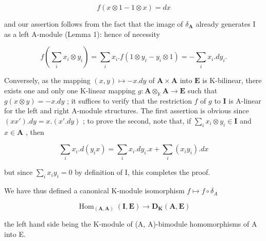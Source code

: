 \[
f (x \otimes 1 - 1 \otimes x) = d x
\]

and our assertion follows from the fact that the image of \(\delta_{\mathbf{A}}\) already generates I as a left A-module (Lemma 1): hence of necessity

\[
f \left(\sum_ {i} x _ {i} \otimes y _ {i}\right) = \sum_ {i} x _ {i}. f (1 \otimes y _ {i} - y _ {i} \otimes 1) = - \sum_ {i} x _ {i}. d y _ {i}.
\]

Conversely, as the mapping \((x,y)\mapsto -x.dy\) of \(\mathbf{A}\times \mathbf{A}\) into \(\mathbf{E}\) is K-bilinear, there exists one and only one K-linear mapping \(g:\mathbf{A}\otimes_{\mathbb{K}}\mathbf{A}\rightarrow \mathbf{E}\) such that \(g(x\otimes y) = -x.dy\) ; it suffices to verify that the restriction \(f\) of \(g\) to \(\mathbf{I}\) is A-linear for the left and right A-module structures. The first assertion is obvious since \((xx') .dy = x.(x'.dy)\) ; to prove the second, note that, if \(\sum_{i}x_{i}\otimes y_{i}\in \mathbf{I}\) and \(x\in \mathbf{A}\) , then

\[
\sum_ {i} x _ {i}. d (y _ {i} x) = \sum_ {i} x _ {i}. d y _ {i}. x + \sum_ {i} (x _ {i} y _ {i}). d x
\]

but since \(\sum_{i}x_{i}y_{i} = 0\) by definition of I, this completes the proof.

We have thus defined a canonical K-module isomorphism \(f \mapsto f \circ \delta_{A}\)

\[
\operatorname{Hom} _ {(\mathbf {A}, \mathbf {A})} (\mathbf {I}, \mathbf {E}) \rightarrow \mathbf {D} _ {\mathbf {K}} (\mathbf {A}, \mathbf {E})
\]

the left hand side being the K-module of (A, A)-bimodule homomorphisms of A into E.
\relax{}
